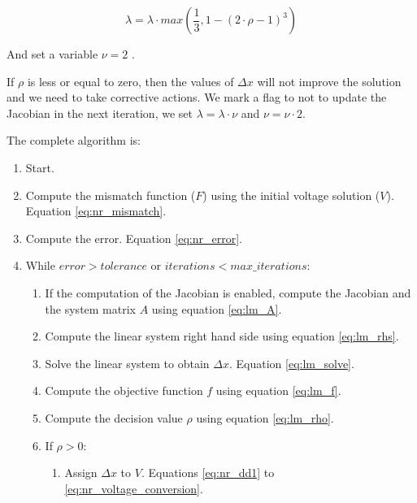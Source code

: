 \documentclass{tufte-book}
\begin{document}
\begin{equation}
\lambda = \lambda \cdot max(\frac{1}{3}, 1-(2\cdot \rho -1)^3)
\label{eq:lm_update_l}
\end{equation}

And set a variable $\nu=2$ .


If $\rho$ is less or equal to zero, then the values of $\Delta x$ will not improve the solution and we need to take corrective actions. We mark a flag to not to update the Jacobian in the next iteration, we set $\lambda=\lambda \cdot \nu$ and $\nu = \nu \cdot 2$.


The complete algorithm is: 

\begin{enumerate}

\item Start.

\item Compute the mismatch function ($F$) using the initial voltage solution ($V$). Equation \ref{eq:nr_mismatch}.

\item Compute the error. Equation \ref{eq:nr_error}.

\item While $error > tolerance$ or $iterations < max\_iterations$:

	\begin{enumerate}
	\item If the computation of the Jacobian is enabled, compute the Jacobian and the system matrix $A$ using equation \ref{eq:lm_A}.
	
	\item Compute the linear system right hand side using equation \ref{eq:lm_rhs}.
	
	\item Solve the linear system to obtain $\Delta x$. Equation \ref{eq:lm_solve}.
	
	\item Compute the objective function $f$ using equation \ref{eq:lm_f}.
	
	\item Compute the decision value $\rho$ using equation \ref{eq:lm_rho}.
	
	\item If $\rho > 0$:
	
		\begin{enumerate}
		\item Assign $\Delta x$ to $V$. Equations \ref{eq:nr_dd1} to \ref{eq:nr_voltage_conversion}.
		

\end{enumerate}
\end{enumerate}
\end{enumerate}
\end{document}
